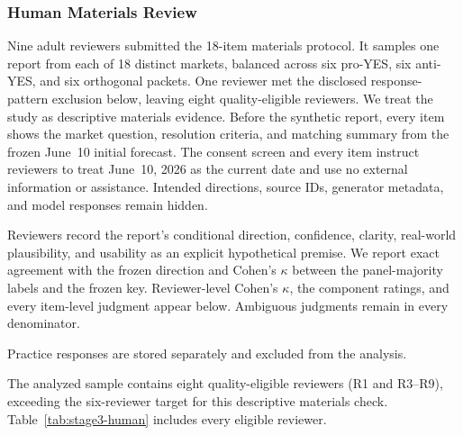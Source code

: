 \begin{center}
\begin{minipage}{\linewidth}
\centering
{}
\label{tab:exp1-selectivity-robustness}
\small

\end{minipage}
\end{center}

\subsubsection{Human Materials Review}
\label{app:exp1-human-review}
Nine adult reviewers submitted the 18-item materials protocol. It samples one
report from each of 18 distinct markets, balanced across six pro-YES, six
anti-YES, and six orthogonal packets. One reviewer met the disclosed
response-pattern exclusion below, leaving eight quality-eligible reviewers.
We treat the study as descriptive materials evidence. Before the synthetic
report, every item shows the market question,
resolution criteria, and matching summary from the frozen June~10 initial
forecast. The consent screen and every item instruct reviewers to treat
June~10, 2026 as the current date and use no external information or assistance.
Intended directions, source IDs, generator
metadata, and model responses remain hidden.

Reviewers record the report's conditional direction, confidence, clarity,
real-world plausibility, and usability as an explicit hypothetical premise.
We report exact agreement with the frozen direction and Cohen's $\kappa$
between the panel-majority labels and the frozen key. Reviewer-level Cohen's
$\kappa$, the component ratings, and every item-level judgment appear below.
Ambiguous judgments remain in every denominator.

Practice responses are stored separately and excluded from the analysis.

The analyzed sample contains eight quality-eligible reviewers (R1 and R3--R9),
exceeding the six-reviewer target for this descriptive materials check.
Table~\ref{tab:stage3-human} includes every eligible reviewer.

